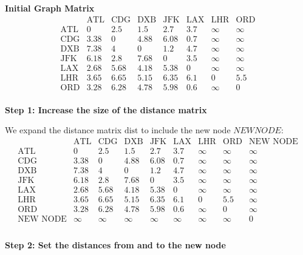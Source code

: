 \documentclass[conference]{IEEEtran}
\begin{document}
\textbf{Initial Graph Matrix}
\[
\begin{array}{c|ccccccc}
     & \text{ATL} & \text{CDG} & \text{DXB} & \text{JFK} & \text{LAX} & \text{LHR} & \text{ORD} \\
\hline
\text{ATL} & 0 & 2.5 & 1.5 & 2.7 & 3.7 & \infty & \infty \\
\text{CDG} & 3.38 & 0 & 4.88 & 6.08 & 0.7 & \infty & \infty \\
\text{DXB} & 7.38 & 4 & 0 & 1.2 & 4.7 & \infty  & \infty \\
\text{JFK} & 6.18 & 2.8 & 7.68 & 0 & 3.5 & \infty & \infty \\
\text{LAX} & 2.68 & 5.68 & 4.18 & 5.38 & 0 & \infty & \infty \\
\text{LHR} & 3.65 & 6.65 & 5.15 & 6.35 & 6.1 & 0 & 5.5 \\
\text{ORD} & 3.28 & 6.28 & 4.78 & 5.98 & 0.6 & \infty & 0 \\
\end{array}
\]

\textbf{Step 1: Increase the size of the distance matrix}

We expand the distance matrix \( \text{dist} \) to include the new node \(NEW NODE \):
\[
\begin{array}{c|ccccccc|c}
     & \text{ATL} & \text{CDG} & \text{DXB} & \text{JFK} & \text{LAX} & \text{LHR} & \text{ORD} & \text{NEW NODE} \\
\hline
\text{ATL} & 0 & 2.5 & 1.5 & 2.7 & 3.7 & \infty & \infty  & \infty\\
\text{CDG} & 3.38 & 0 & 4.88 & 6.08 & 0.7 & \infty & \infty & \infty \\
\text{DXB} & 7.38 & 4 & 0 & 1.2 & 4.7 & \infty  & \infty & \infty \\
\text{JFK} & 6.18 & 2.8 & 7.68 & 0 & 3.5 & \infty & \infty & \infty \\
\text{LAX} & 2.68 & 5.68 & 4.18 & 5.38 & 0 & \infty & \infty & \infty \\
\text{LHR} & 3.65 & 6.65 & 5.15 & 6.35 & 6.1 & 0 & 5.5 & \infty \\
\text{ORD} & 3.28 & 6.28 & 4.78 & 5.98 & 0.6 & \infty & 0 & \infty\\
\hline
\text{NEW NODE} & \infty & \infty & \infty & \infty & \infty & \infty & \infty & 0 \\
\end{array}
\]
\\
\textbf{Step 2: Set the distances from and to the new node}
\end{document}
